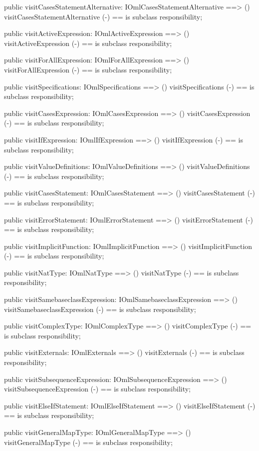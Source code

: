 \begin{vdm_al}
  public visitCasesStatementAlternative: IOmlCasesStatementAlternative ==> ()
  visitCasesStatementAlternative (-) == is subclass responsibility;

  public visitActiveExpression: IOmlActiveExpression ==> ()
  visitActiveExpression (-) == is subclass responsibility;

  public visitForAllExpression: IOmlForAllExpression ==> ()
  visitForAllExpression (-) == is subclass responsibility;

  public visitSpecifications: IOmlSpecifications ==> ()
  visitSpecifications (-) == is subclass responsibility;

  public visitCasesExpression: IOmlCasesExpression ==> ()
  visitCasesExpression (-) == is subclass responsibility;

  public visitIfExpression: IOmlIfExpression ==> ()
  visitIfExpression (-) == is subclass responsibility;

  public visitValueDefinitions: IOmlValueDefinitions ==> ()
  visitValueDefinitions (-) == is subclass responsibility;

  public visitCasesStatement: IOmlCasesStatement ==> ()
  visitCasesStatement (-) == is subclass responsibility;

  public visitErrorStatement: IOmlErrorStatement ==> ()
  visitErrorStatement (-) == is subclass responsibility;

  public visitImplicitFunction: IOmlImplicitFunction ==> ()
  visitImplicitFunction (-) == is subclass responsibility;

  public visitNatType: IOmlNatType ==> ()
  visitNatType (-) == is subclass responsibility;

  public visitSamebaseclassExpression: IOmlSamebaseclassExpression ==> ()
  visitSamebaseclassExpression (-) == is subclass responsibility;

  public visitComplexType: IOmlComplexType ==> ()
  visitComplexType (-) == is subclass responsibility;

  public visitExternals: IOmlExternals ==> ()
  visitExternals (-) == is subclass responsibility;

  public visitSubsequenceExpression: IOmlSubsequenceExpression ==> ()
  visitSubsequenceExpression (-) == is subclass responsibility;

  public visitElseIfStatement: IOmlElseIfStatement ==> ()
  visitElseIfStatement (-) == is subclass responsibility;

  public visitGeneralMapType: IOmlGeneralMapType ==> ()
  visitGeneralMapType (-) == is subclass responsibility;


\end{vdm_al}
